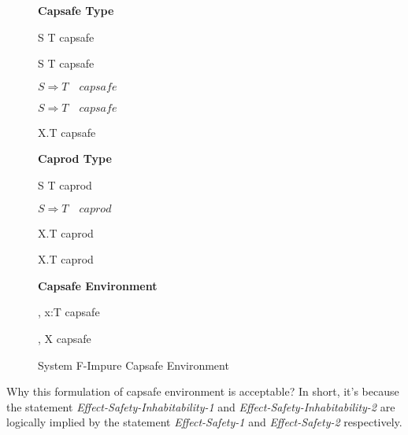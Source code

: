\begin{figure}[h]
\begin{framed}

\setlength{\columnseprule}{0.4pt}
\begin{multicols}{2}

\textbf{Capsafe Type}


{ S \to T \quad capsafe }

{ S \to T \quad capsafe }

{ \colorbox{shade}{$S \Rightarrow T \quad capsafe$} }

{ \colorbox{shade}{$S \Rightarrow T \quad capsafe$} }

{ \forall X.T \quad capsafe }

\columnbreak

\textbf{Caprod Type}


{ S \to T \quad caprod }

{ \colorbox{shade}{$S \Rightarrow T \quad caprod$} }

{ \forall X.T \quad caprod }

{ \forall X.T \quad caprod }

\textbf{Capsafe Environment}


{ \Gamma, \; x:T \quad capsafe }

{ \Gamma, \; X \quad capsafe }

\end{multicols}
\end{framed}

\caption{System F-Impure Capsafe Environment}
\label{fig:f-impure-capsafe-definition}
\end{figure}

Why this formulation of capsafe environment is acceptable? In short,
it's because the statement \emph{Effect-Safety-Inhabitability-1} and
\emph{Effect-Safety-Inhabitability-2} are logically implied by the
statement \emph{Effect-Safety-1} and \emph{Effect-Safety-2}
respectively.

